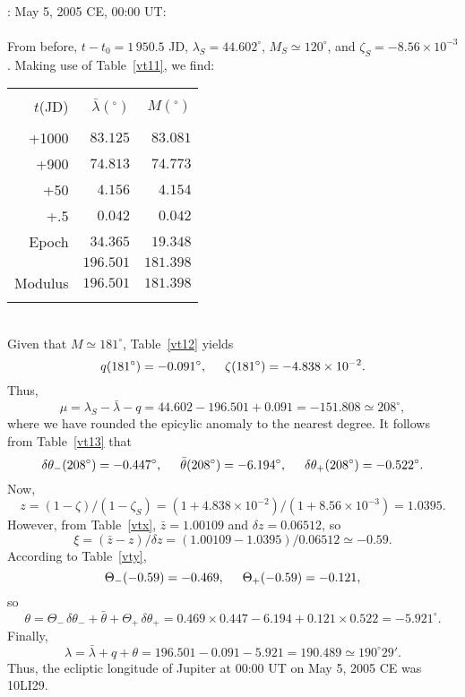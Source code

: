 ~\\
: May 5,  2005 CE, 00:00 UT:\\
~\\
From before, $t-t_0=1\,950.5$ JD, $\lambda_S= 44.602^\circ$, $M_S\simeq 120^\circ$, and $\zeta_S= -8.56\times 10^{-3}$. Making use of
Table~\ref{vt11}, we find:\\
\begin{tabular}{rrr}
&&\\
$t$(JD) & $ \bar{\lambda}(^\circ)$ & $M(^\circ)$\\[-2ex]
&&\\
+1000 & $83.125$ & $83.081$\\
+900 & $74.813$ & $74.773$\\
+50 & $4.156$ & $4.154$\\
+.5 & $0.042$ & $0.042$\\
Epoch & $34.365$ & $19.348$\\\cline{2-3}
&$196.501$ & $181.398$\\\cline{2-3}
Modulus & $196.501$ & $181.398$\\ 
&&\\
\end{tabular}\\
Given that $M\simeq 181^\circ$, Table~\ref{vt12} yields 
$$
q(181^\circ)= -0.091^\circ,\mbox{\hspace{0.5cm}}\zeta(181^\circ)=-4.838\times 10^{-2}.
$$
Thus, 
$$
\mu=\lambda_S - \bar{\lambda}-q = 44.602-196.501 + 0.091= -151.808\simeq
208^\circ,
$$
where we have rounded the epicylic anomaly to the nearest degree. It follows from Table~\ref{vt13}
that 
$$
\delta\theta_-(208^\circ) = -0.447^\circ,\mbox{\hspace{0.5cm}}\bar{\theta}(208^\circ)=-6.194^\circ, \mbox{\hspace{0.5cm}}\delta\theta_+(208^\circ) = -0.522^\circ.
$$
Now,
$$ 
z= (1-\zeta)/(1-\zeta_S) = (1+4.838\times 10^{-2})/(1+8.56\times 10^{-3}) =
1.0395.
$$
However, from Table~\ref{vtx}, $\bar{z}= 1.00109$ and $\delta z = 0.06512$,
so
$$
\xi = (\bar{z}-z)/\delta z = (1.00109-1.0395)/0.06512 \simeq -0.59.
$$
According to Table~\ref{vty}, 
$$
\Theta_-(-0.59) = -0.469, \mbox{\hspace{0.5cm}}\Theta_+(-0.59) = -0.121,
$$
so
$$
\theta  = \Theta_-\,\delta\theta_- + \bar{\theta}+\Theta_+\,\delta\theta_+ = 0.469\times 0.447-6.194+0.121\times 0.522 =- 5.921^\circ.
$$ 
Finally,
$$
\lambda=\bar{\lambda} + q + \theta= 196.501-0.091-5.921=190.489 \simeq 190^\circ 29'.
$$
Thus,
the ecliptic longitude of Jupiter at 00:00 UT on May 5, 2005 CE was 10LI29.

